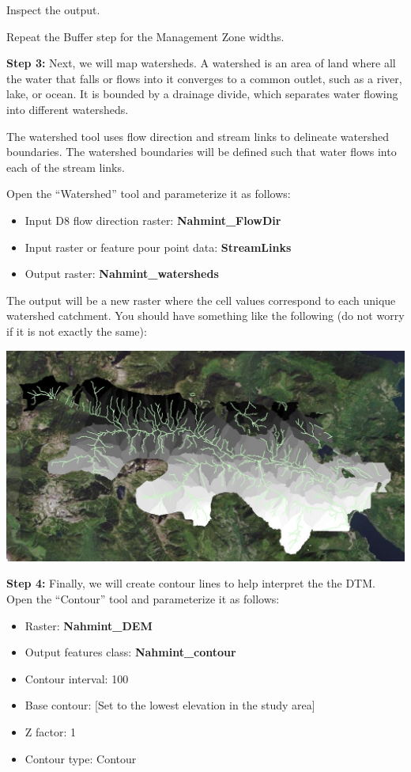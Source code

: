 \documentclass[
]{book}
\providecommand{\tightlist}{%
  \setlength{\itemsep}{0pt}\setlength{\parskip}{0pt}}
\begin{document}
Inspect the output.

Repeat the Buffer step for the Management Zone widths.

\textbf{Step 3:} Next, we will map watersheds. A watershed is an area of land where all the water that falls or flows into it converges to a common outlet, such as a river, lake, or ocean. It is bounded by a drainage divide, which separates water flowing into different watersheds.

The watershed tool uses flow direction and stream links to delineate watershed boundaries. The watershed boundaries will be defined such that water flows into each of the stream links.

Open the ``Watershed'' tool and parameterize it as follows:

\begin{itemize}
\tightlist
\item
  Input D8 flow direction raster: \textbf{Nahmint\_FlowDir}
\item
  Input raster or feature pour point data: \textbf{StreamLinks}
\item
  Output raster: \textbf{Nahmint\_watersheds}
\end{itemize}

The output will be a new raster where the cell values correspond to each unique watershed catchment. You should have something like the following (do not worry if it is not exactly the same):

\includegraphics[width=0.75\linewidth]{images/03-map-layers}

\textbf{Step 4:} Finally, we will create contour lines to help interpret the the DTM. Open the ``Contour'' tool and parameterize it as follows:

\begin{itemize}
\tightlist
\item
  Raster: \textbf{Nahmint\_DEM}
\item
  Output features class: \textbf{Nahmint\_contour}
\item
  Contour interval: 100
\item
  Base contour: {[}Set to the lowest elevation in the study area{]}
\item
  Z factor: 1
\item
  Contour type: Contour
\end{itemize}
\end{document}
